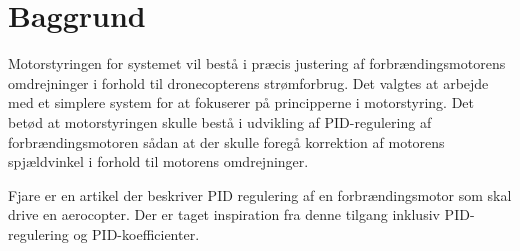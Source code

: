 
\vspace{-5mm}
\setcounter{tocdepth}{2}
\tableofcontents
\thispagestyle{empty}
\newpage
\setcounter{page}{1}


\section{Baggrund}
\label{sec:baggrund}

Motorstyringen for systemet vil bestå i præcis justering af forbrændingsmotorens omdrejninger i forhold til dronecopterens strømforbrug. Det valgtes at arbejde med et simplere system for at fokuserer på principperne i motorstyring. Det betød at motorstyringen skulle bestå i udvikling af PID-regulering af forbrændingsmotoren sådan at der skulle foregå korrektion af motorens spjældvinkel i forhold til motorens omdrejninger.

Fjare\autocite{pid1} er en artikel der beskriver PID regulering af en forbrændingsmotor som skal drive en aerocopter. Der er taget inspiration fra denne tilgang inklusiv PID-regulering og PID-koefficienter.

